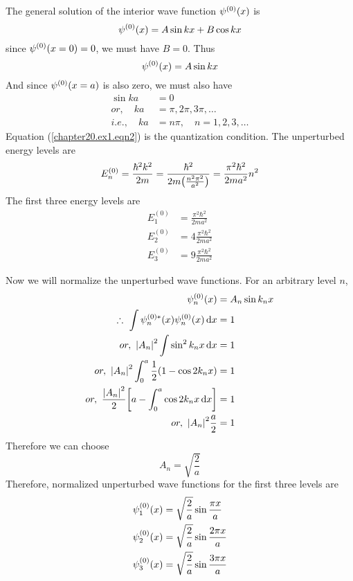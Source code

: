 \begin{enumerate}
			The general solution of the interior wave function $\psi^{(0)}\qty(x)$ is
			\begin{equation*}
				\psi^{(0)}\qty(x) = A \sin k x + B \cos k x
			\end{equation*}
			since $\psi^{(0)}\qty(x=0)=0$, we must have $B=0$. Thus
			\begin{equation*}
				\psi^{(0)}\qty(x) = A \sin k x 
			\end{equation*}
			And since $\psi^{(0)}\qty(x=a)$ is also zero, we must also have
			\begin{align}
				\sin k a &= 0 \nonumber\\
				or, \quad k a &= \pi, 2\pi, 3\pi, \ldots \nonumber\\
				i.e.,\quad k a &= n \pi, \quad n = 1,2,3,\ldots
				\label{chapter20.ex1.eqn2}
			\end{align}
			Equation (\ref{chapter20.ex1.eqn2}) is the quantization condition. The unperturbed energy levels are
			\begin{equation}
				E^{(0)}_n = \frac{\hbar^2 k^2}{2 m} = \frac{\hbar^2}{2 m \qty(\frac{n^2 \pi^2}{a^2})} = \frac{\pi^2 \hbar^2}{2 m a^2} n^2
				\label{chapter20.ex1.eqn3}
			\end{equation}
			The first three energy levels are
			\begin{align*}
				E_1^{(0)} &= \frac{\pi^2 \hbar^2}{2 m a^2} \\
				E_2^{(0)} &= 4 \frac{\pi^2 \hbar^2}{2 m a^2} \\
				E_3^{(0)} &= 9 \frac{\pi^2 \hbar^2}{2 m a^2}
			\end{align*}
			
			Now we will normalize the unperturbed wave functions. For an arbitrary level $n$,
			\begin{align*}
				\psi_n^{(0)}\qty(x) &= A_n \sin k_n x \\
				\therefore \ \int \psi_n^{(0)*}\qty(x) \psi_n^{(0)}\qty(x) \dd{x} &= 1 \\
				or,\ \abs{A_n}^2 \int \sin^2 k_n x \dd{x} &= 1 \\
				or,\ \abs{A_n}^2 \int_{0}^{a} \frac{1}{2} \qty(1 - \cos 2 k_n x) &= 1 \\
				or,\ \frac{\abs{A_n}^2}{2} \qty[a - \int_{0}^{a} \cos 2 k_n x \dd{x}] &= 1 \\
				or, \ \abs{A_n}^2 \frac{a}{2} &= 1
			\end{align*}
			Therefore we can choose
			\begin{equation}
				A_n = \sqrt{\frac{2}{a}}
			\end{equation}
			Therefore, normalized unperturbed wave functions for the first three levels are
			\begin{align*}
				\psi_1^{(0)} \qty(x) &=  \sqrt{\frac{2}{a}} \sin \frac{\pi x }{a} \\
				\psi_2^{(0)} \qty(x) &=  \sqrt{\frac{2}{a}} \sin \frac{2\pi x }{a} \\
				\psi_3^{(0)} \qty(x) &=  \sqrt{\frac{2}{a}} \sin \frac{3\pi x }{a} 
			\end{align*}
			

\end{enumerate}
